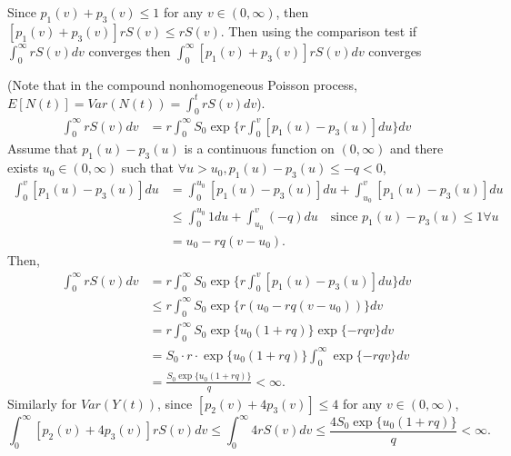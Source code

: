 \documentclass[10pt]{article}
\begin{document}
Since $p_1(v) + p_3(v) \leq 1$ for any $v \in (0, \infty)$, then $[p_1(v)+p_3(v)] r S(v) \leq rS(v)$. Then using the comparison test if $\int_0^\infty r S(v) dv$ converges then $\int_0^\infty [p_1(v)+p_3(v)] r S(v) dv$ converges

(Note that in the compound nonhomogeneous Poisson process, $E[N(t)] = Var(N(t)) = \int_0^t r S(v) dv$).
\begin{equation}
\begin{split}
\int_0^\infty r S(v) dv & = r \int_0^\infty S_0 \exp \Big\{ r \int_0^v [p_1(u) - p_3(u)] du \Big\} dv
\end{split}
\end{equation}
Assume that $p_1(u) - p_3(u)$ is a continuous function on $(0, \infty)$ and there exists $u_0 \in (0, \infty)$ such that $\forall u>u_0, p_1(u) - p_3(u) \leq -q < 0$,
\begin{equation}
\begin{split}
\int_0^v [p_1(u) - p_3(u)] du  &= \int_0^{u_0}  [p_1(u) - p_3(u)] du  + \int_{u_0}^{v}  [p_1(u) - p_3(u)] du  \\
& \leq  \int_0^{u_0}  1 du + \int_{u_0}^{v} (-q) du  \quad \text{since $p_1(u)-p_3(u) \leq 1 \forall u$} \\
& = u_0 - rq(v-u_0).
\end{split}
\end{equation}
Then,
\begin{equation}
\begin{split}
\int_0^\infty r S(v) dv & = r \int_0^\infty S_0 \exp \Big\{ r \int_0^v [p_1(u) - p_3(u)] du \Big\} dv \\
& \leq r \int_0^\infty S_0 \exp \{r ( u_0 - rq(v-u_0))\} dv \\
& = r \int_0^\infty S_0 \exp\{u_0 (1+rq)\} \exp\{-rqv\}dv \\
& = S_0 \cdot r \cdot \exp\{u_0 (1+rq)\} \int_0^\infty\exp\{-rqv\}dv \\
& = \frac{S_0 \exp\{u_0 (1+rq)\}}{q} < \infty.
\end{split}
\end{equation}
Similarly for $Var(Y(t))$, since $[p_2(v) + 4p_3(v)] \leq 4$ for any $v \in (0, \infty)$,
$$ \int_0^\infty [p_2(v) + 4p_3(v)] r S(v) dv \leq \int_0^\infty 4 r S(v) dv  \leq \frac{4 S_0 \exp\{u_0 (1+rq)\}}{q} < \infty.$$
\end{document}
